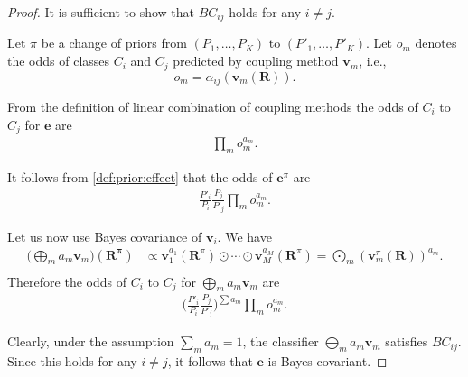 \begin{proof}
It is sufficient to show that $BC_{ij}$ holds for any $i\not= j$. 

Let $\pi$ be a change of priors from $(P_1, \ldots, P_K)$  to $(P'_1, \ldots, P'_K)$. Let $o_m$ denotes the odds of classes $C_i$ and $C_j$ predicted by coupling method $\boldsymbol{v}_m$, i.e.,
$$
o_m = \alpha_{ij}(\boldsymbol{v}_m(\boldsymbol{R})).
$$

From the definition of linear combination of coupling methods the odds of $C_i$ to $C_j$ for $\boldsymbol{e}$ are
\begin{align}
\prod_m o_m^{a_m}.
\end{align}

It follows from \eqref{def:prior:effect} that the odds of $\boldsymbol{e}^\pi$ are 
\begin{align}
\frac{P'_i}{P_i} \frac{P_j}{P'_j} \prod_m o_m^{a_m}.
\end{align}

Let us now use Bayes covariance of $\boldsymbol{v}_i$. 
We have
\begin{align}
	\biggl(\bigoplus_m a_m \boldsymbol{v}_m\biggr)(\boldsymbol{R^\pi}) & \propto 
	\boldsymbol{v}_1^{a_1}(\boldsymbol{R}^\pi) \odot \cdots \odot \boldsymbol{v}_M^{a_M}(\boldsymbol{R}^\pi) =  \bigodot_m  (\boldsymbol{v}_m^\pi(\boldsymbol{R}))^{a_m}. \\
\end{align}
Therefore the odds of $C_i$ to $C_j$ for $\bigoplus_m a_m \boldsymbol{v}_m$ are 
\begin{align}
\biggl(\frac{P'_i}{P_i} \frac{P_j}{P'_j} \biggr)^{\sum a_m} \prod_m o_m^{a_m}.
\end{align}

Clearly, under the assumption $\sum_m a_m = 1$, the classifier $\bigoplus_m a_m \boldsymbol{v}_m$ satisfies $BC_{ij}$. Since this holds for any $i\not=j$,  it follows that $\boldsymbol{e}$ is Bayes covariant.
\end{proof}


% 

